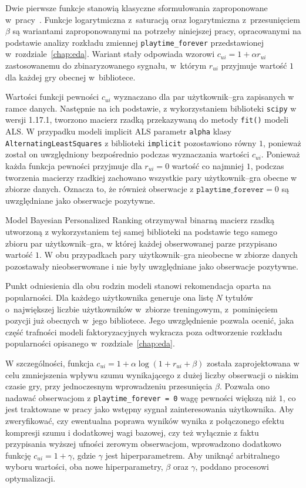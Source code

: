 Dwie pierwsze funkcje stanowią klasyczne sformułowania zaproponowane w~pracy~\cite{hu2008implicit}. Funkcje logarytmiczna z~saturacją oraz logarytmiczna z~przesunięciem $\beta$ są wariantami zaproponowanymi na potrzeby niniejszej pracy, opracowanymi na podstawie analizy rozkładu zmiennej \texttt{playtime\_forever} przedstawionej w~rozdziale~\ref{chap:eda}. Wariant stały odpowiada wzorowi $c_{ui} = 1 + \alpha r_{ui}$ zastosowanemu do zbinaryzowanego sygnału, w~którym $r_{ui}$ przyjmuje wartość $1$ dla każdej gry obecnej w~bibliotece.

Wartości funkcji pewności $c_{ui}$ wyznaczano dla par użytkownik--gra zapisanych w ramce danych. Następnie na ich podstawie, z wykorzystaniem biblioteki \texttt{scipy} w wersji 1.17.1, tworzono macierz rzadką przekazywaną do metody \texttt{fit()} modeli ALS. W przypadku modeli implicit ALS parametr \texttt{alpha} klasy \texttt{AlternatingLeastSquares} z biblioteki \texttt{implicit} pozostawiono równy $1$, ponieważ został on uwzględniony bezpośrednio podczas wyznaczania wartości $c_{ui}$. Ponieważ każda funkcja pewności przyjmuje dla $r_{ui}=0$ wartość co najmniej $1$, podczas tworzenia macierzy rzadkiej zachowano wszystkie pary użytkownik--gra obecne w zbiorze danych. Oznacza to, że również obserwacje z $\texttt{playtime\_forever}=0$ są uwzględniane jako obserwacje pozytywne.

Model Bayesian Personalized Ranking otrzymywał binarną macierz rzadką utworzoną z wykorzystaniem tej samej biblioteki na podstawie tego samego zbioru par użytkownik--gra, w której każdej obserwowanej parze przypisano wartość $1$. W obu przypadkach pary użytkownik--gra nieobecne w zbiorze danych pozostawały nieobserwowane i nie były uwzględniane jako obserwacje pozytywne.

Punkt odniesienia dla obu rodzin modeli stanowi rekomendacja oparta na popularności. Dla każdego użytkownika generuje ona listę $N$ tytułów o~największej liczbie użytkowników w~zbiorze treningowym, z~pominięciem pozycji już obecnych w~jego bibliotece. Jego uwzględnienie
pozwala ocenić, jaka część trafności modeli faktoryzacyjnych wykracza poza odtworzenie rozkładu popularności opisanego w~rozdziale~\ref{chap:eda}.

W szczególności, funkcja $c_{ui} = 1 + \alpha \log(1 + r_{ui} + \beta)$ została zaprojektowana w celu zmniejszenia wpływu szumu wynikającego z dużej liczby obserwacji o niskim czasie gry, przy jednoczesnym wprowadzeniu przesunięcia $\beta$. Pozwala ono nadawać obserwacjom z \texttt{playtime\_forever = 0} wagę pewności większą niż $1$, co jest traktowane w pracy jako wstępny sygnał zainteresowania użytkownika. Aby zweryfikować, czy ewentualna poprawa wyników wynika z połączonego efektu kompresji szumu i dodatkowej wagi bazowej, czy też wyłącznie z faktu przypisania wyższej ufności zerowym obserwacjom, wprowadzono dodatkowo funkcję $c_{ui} = 1 + \gamma$, gdzie $\gamma$ jest hiperparametrem. Aby uniknąć arbitralnego wyboru wartości, oba nowe hiperparametry, $\beta$ oraz $\gamma$, poddano procesowi optymalizacji.


